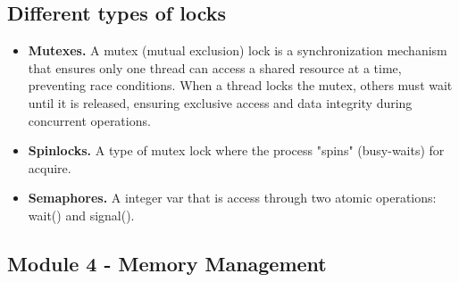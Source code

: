 \documentclass{article}
\begin{document}

\subsection{Different types of locks}

\begin{itemize}
    \item {\bf Mutexes.} A mutex (mutual exclusion) lock is a synchronization mechanism that ensures only one thread can 
    access a shared resource at a time, preventing race conditions. 
    When a thread locks the mutex, others must wait until it is released, 
    ensuring exclusive access and data integrity during concurrent operations.
    \item {\bf Spinlocks.} A type of mutex lock where the process "spins" (busy-waits) for acquire. 
    \item {\bf Semaphores.} A integer var that is access through two atomic operations: wait() and signal().
\end{itemize}





\subsection{Module 4 - Memory Management}
\end{document}
